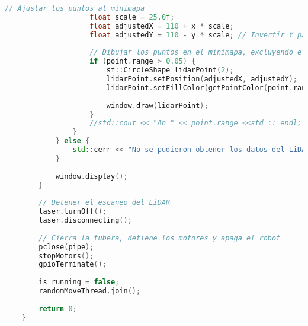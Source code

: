 \begin{lstlisting}[language={C++}, caption={Primer ajuste de c\'odigo}, label={PrimerAjuste}]
                    // Ajustar los puntos al minimapa
                    float scale = 25.0f;
                    float adjustedX = 110 + x * scale;
                    float adjustedY = 110 - y * scale; // Invertir Y para coordinar con la pantalla
    
                    // Dibujar los puntos en el minimapa, excluyendo el centro (0,0)
                    if (point.range > 0.05) {
                        sf::CircleShape lidarPoint(2);
                        lidarPoint.setPosition(adjustedX, adjustedY);
                        lidarPoint.setFillColor(getPointColor(point.range, max_range));
    
                        window.draw(lidarPoint);
                    }
                    //std::cout << "An " << point.range <<std :: endl;
                }
            } else {
                std::cerr << "No se pudieron obtener los datos del LiDAR." << std::endl;
            }
    
            window.display();
        }
    
        // Detener el escaneo del LiDAR
        laser.turnOff();
        laser.disconnecting();
    
        // Cierra la tubera, detiene los motores y apaga el robot
        pclose(pipe);
        stopMotors();
        gpioTerminate();
    
        is_running = false;
        randomMoveThread.join();
    
        return 0;
    }
\end{lstlisting}
